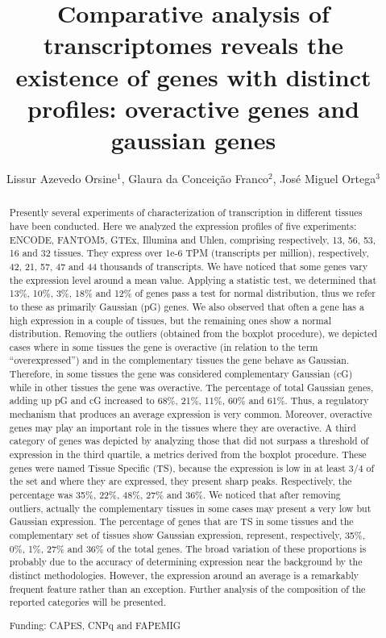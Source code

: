 \documentclass[twoside]{article}
\title{\vspace{-15mm}\fontsize{24pt}{10pt}\selectfont\textbf{Comparative analysis of transcriptomes reveals the existence of genes with distinct profiles: overactive genes and gaussian genes}} %
\author{Lissur Azevedo Orsine$^1$, Glaura da Concei\c{c}\~ao Franco$^2$, Jos\'e Miguel Ortega$^3$}
\affil{1 UFMG\\ 2 DEPARTAMENTO DE ESTAT\'ISTICA, UFMG\\ 3 UFMG. LABORAT\'ORIO DE BIODADOS\\ }
\date{}
\begin{document}
\maketitle %

\thispagestyle{fancy} %


\begin{abstract}
Presently several experiments of characterization of transcription in different tissues have been conducted. Here we analyzed the expression profiles of five experiments: ENCODE, FANTOM5, GTEx, Illumina and Uhlen, comprising respectively, 13, 56, 53, 16 and 32 tissues. They express over 1e-6 TPM (transcripts per million), respectively, 42, 21, 57, 47 and 44 thousands of transcripts. We have noticed that some genes vary the expression level around a mean value. Applying a statistic test, we determined that 13\%, 10\%, 3\%, 18\% and 12\% of genes pass a test for normal distribution, thus we refer to these as primarily Gaussian  (pG) genes. We also observed that often a gene has a high expression in a couple of tissues, but the remaining ones show a normal distribution. Removing the outliers (obtained from the boxplot procedure), we depicted cases where in some tissues the gene is overactive (in relation to the term ``overexpressed'') and in the complementary tissues the gene behave as Gaussian. Therefore, in some tissues the gene was considered complementary Gaussian (cG) while in other tissues the gene was overactive. The percentage of total Gaussian genes, adding up pG and cG increased to 68\%, 21\%, 11\%, 60\% and 61\%. Thus, a regulatory mechanism that produces an average expression is very common. Moreover, overactive genes may play an important role in the tissues where they are overactive. A third category of genes was depicted by analyzing those that did not surpass a threshold of expression in the third quartile, a metrics derived from the boxplot procedure. These genes were named Tissue Specific (TS), because the expression is low in at least 3/4 of the set and where they are expressed, they present sharp peaks. Respectively, the percentage was 35\%, 22\%, 48\%, 27\% and 36\%. We noticed that after removing outliers, actually the complementary tissues in some cases may present a very low but Gaussian expression. The percentage of genes that are TS in some tissues and the complementary set of tissues show Gaussian expression, represent, respectively, 35\%, 0\%, 1\%, 27\% and 36\% of the total genes. The broad variation of these proportions is probably due to the accuracy of determining expression near the background by the distinct methodologies. However, the expression around an average is a remarkably frequent feature rather than an exception. Further analysis of the composition of the reported categories will be presented.

Funding: CAPES, CNPq and FAPEMIG
\end{abstract}
\end{document}
